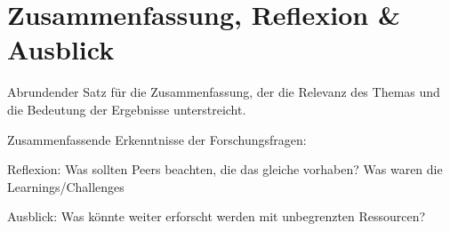\section{Zusammenfassung, Reflexion \& Ausblick} \label{sec:ausblick}

Abrundender Satz für die Zusammenfassung, der die Relevanz des Themas und die Bedeutung der Ergebnisse unterstreicht.

Zusammenfassende Erkenntnisse der Forschungsfragen:

Reflexion: Was sollten Peers beachten, die das gleiche vorhaben? Was waren die Learnings/Challenges

Ausblick: Was könnte weiter erforscht werden mit unbegrenzten Ressourcen?